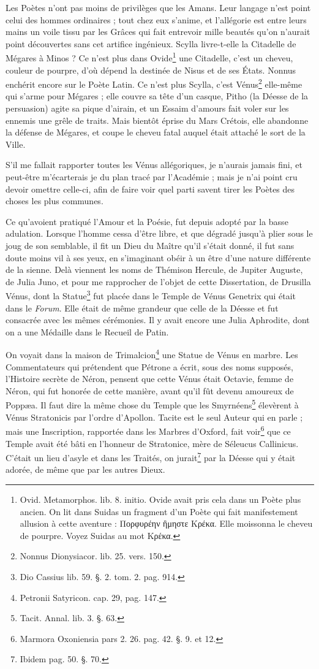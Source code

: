 \documentclass[a4paper, 11pt, oneside, polutonikogreek, french]{article}
\begin{document}
Les Poètes n'ont pas moins de privilèges que les Amans. Leur langage n'est point celui des hommes ordinaires ; tout chez eux s'anime, et l'allégorie est entre leurs mains un voile tissu par les Grâces qui fait entrevoir mille beautés qu'on n'aurait point découvertes sans cet artifice ingénieux. Scylla livre-t-elle la Citadelle de Mégares à Minos ? Ce n'est plus dans Ovide\footnote{Ovid. Metamorphos. lib. 8. initio. Ovide avait pris cela dans un Poète plus ancien. On lit dans Suidas un fragment d'un Poète qui fait manifestement allusion à cette aventure : Πορφυρέην ἢμηστε Κρέκα. Elle moissonna le cheveu de pourpre. Voyez Suidas au mot Κρέκα.} une Citadelle, c'est un cheveu, couleur de pourpre, d'où dépend la destinée de Nisus et de ses États. Nonnus enchérit encore sur le Poète Latin. Ce n'est plus Scylla, c'est Vénus\footnote{Nonnus Dionysiacor. lib. 25. vers. 150.} elle-même qui s'arme pour Mégares ; elle couvre sa tête d'un casque, Pitho (la Déesse de la persuasion) agite sa pique d'airain, et un Essaim d'amours fait voler sur les ennemis une grêle de traits. Mais bientôt éprise du Mars Crétois, elle abandonne la défense de Mégares, et coupe le cheveu fatal auquel était attaché le sort de la Ville.

S'il me fallait rapporter toutes les Vénus allégoriques, je n'aurais jamais fini, et peut-être m'écarterais je du plan tracé par l'Académie ; mais je n'ai point cru devoir omettre celle-ci, afin de faire voir quel parti savent tirer les Poètes des choses les plus communes.

Ce qu'avoient pratiqué l'Amour et la Poésie, fut depuis adopté par la basse adulation. Lorsque l'homme cessa d'être libre, et que dégradé jusqu'à plier sous le joug de son semblable, il fit un Dieu du Maître qu'il s'était donné, il fut sans doute moins vil à ses yeux, en s'imaginant obéir à un être d'une nature différente de la sienne. Delà viennent les noms de Thémison Hercule, de Jupiter Auguste, de Julia Juno, et pour me rapprocher de l'objet de cette Dissertation, de Drusilla Vénus, dont la Statue\footnote{Dio Cassius lib. 59. §. 2. tom. 2. pag. 914.} fut placée dans le Temple de Vénus Genetrix qui était dans le \emph{Forum}. Elle était de même grandeur que celle de la Déesse et fut consacrée avec les mêmes cérémonies. Il y avait encore une Julia Aphrodite, dont on a une Médaille dans le Recueil de Patin.

On voyait dans la maison de Trimalcion\footnote{Petronii Satyricon. cap. 29, pag. 147.} une Statue de Vénus en marbre. Les Commentateurs qui prétendent que Pétrone a écrit, sous des noms supposés, l'Histoire secrète de Néron, pensent que cette Vénus était Octavie, femme de Néron, qui fut honorée de cette manière, avant qu'il fût devenu amoureux de Poppæa. Il faut dire la même chose du Temple que les Smyrnéens\footnote{Tacit. Annal. lib. 3. §. 63.} élevèrent à Vénus Stratonicis par l'ordre d'Apollon. Tacite est le seul Auteur qui en parle ; mais une Inscription, rapportée dans les Marbres d'Oxford, fait voir\footnote{Marmora Oxoniensia pars 2. 26. pag. 42. §. 9. et 12.} que ce Temple avait été bâti en l'honneur de Stratonice, mère de Séleucus Callinicus. C'était un lieu d'asyle et dans les Traités, on jurait\footnote{Ibidem pag. 50. §. 70.} par la Déesse qui y était adorée, de même que par les autres Dieux.
\end{document}
